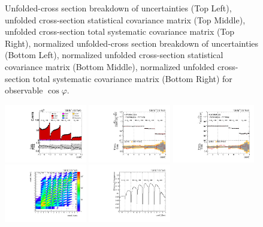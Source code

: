 \begin{figure}[htb]
\begin{center}
\caption{Unfolded-cross section breakdown of uncertainties (Top Left), unfolded cross-section statistical covariance matrix (Top Middle), unfolded cross-section total systematic covariance matrix (Top Right), normalized unfolded-cross section breakdown of uncertainties (Bottom Left), normalized unfolded cross-section statistical covariance matrix (Bottom Middle), normalized unfolded cross-section total systematic covariance matrix (Bottom Right) for  observable $\cos\varphi$.}
\label{fig:ll_cHel_uncertainties}
\end{center}
\end{figure}
\clearpage
\begin{figure}[htb]
\begin{center}
 \includegraphics[width=0.32\textwidth]{fig_fullRun2UL/controlplots/combined/Hyp_AntiLeptonBk_vs_TTBarMass.pdf}
 \includegraphics[width=0.32\textwidth]{fig_fullRun2UL/unfolding/combined/UnfoldedResults_b1k_mttbar.pdf}
 \includegraphics[width=0.32\textwidth]{fig_fullRun2UL/unfolding/combined/UnfoldedResultsNorm_b1k_mttbar.pdf} \\
 \includegraphics[width=0.32\textwidth]{fig_fullRun2UL/unfolding/combined/ResponseMatrix_b1k_mttbar.pdf}
 \includegraphics[width=0.32\textwidth]{fig_fullRun2UL/unfolding/combined/TotEff_b1k_mttbar.pdf}

\end{center}
\end{figure}
